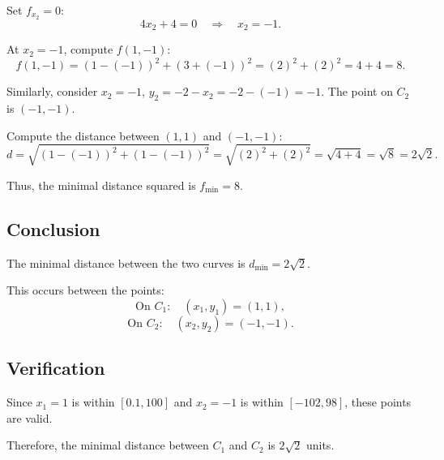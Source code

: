 \documentclass[11pt]{article}
\begin{document}
Set \( f_{x_2} = 0 \):
\[
4 x_2 + 4 = 0 \quad \Rightarrow \quad x_2 = -1.
\]

At \( x_2 = -1 \), compute \( f(1, -1) \):
\[
f(1, -1) = (1 - (-1))^2 + (3 + (-1))^2 = (2)^2 + (2)^2 = 4 + 4 = 8.
\]

Similarly, consider \( x_2 = -1 \), \( y_2 = -2 - x_2 = -2 - (-1) = -1 \). The point on \( C_2 \) is \( (-1, -1) \).

Compute the distance between \( (1, 1) \) and \( (-1, -1) \):
\[
d = \sqrt{(1 - (-1))^2 + (1 - (-1))^2} = \sqrt{(2)^2 + (2)^2} = \sqrt{4 + 4} = \sqrt{8} = 2 \sqrt{2}.
\]

Thus, the minimal distance squared is \( f_{\text{min}} = 8 \).

\newpage

\subsection{Conclusion}

The minimal distance between the two curves is \( d_{\text{min}} = 2 \sqrt{2} \).

This occurs between the points:
\[
\text{On } C_1: \quad (x_1, y_1) = (1, 1),
\]
\[
\text{On } C_2: \quad (x_2, y_2) = (-1, -1).
\]

\newpage

\subsection{Verification}

Since \( x_1 = 1 \) is within \( [0.1, 100] \) and \( x_2 = -1 \) is within \( [-102, 98] \), these points are valid.

Therefore, the minimal distance between \( C_1 \) and \( C_2 \) is \( 2 \sqrt{2} \) units.
\end{document}
